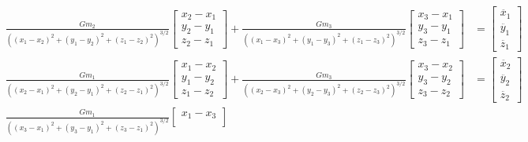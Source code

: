 \documentclass{report}
\begin{document}
            \begin{align}
                \frac{G m_2}{((x_1 - x_2)^2 + (y_1 - y_2)^2 + (z_1 - z_2)^2)^{3/2}} 
                \begin{bmatrix}
                    x_2 - x_1 \\
                    y_2 - y_1 \\
                    z_2 - z_1
                \end{bmatrix} + 
                \frac{G m_3}{((x_1 - x_3)^2 + (y_1 - y_3)^2 + (z_1 - z_3)^2)^{3/2}} 
                \begin{bmatrix}
                    x_3 - x_1 \\
                    y_3 - y_1 \\
                    z_3 - z_1
                \end{bmatrix} &= \begin{bmatrix}
                    \ddot{x_1} \\
                    \ddot{y_1} \\ 
                    \ddot{z_1}
                \end{bmatrix} \\
                \frac{G m_1}{((x_2 - x_1)^2 + (y_2 - y_1)^2 + (z_2 - z_1)^2)^{3/2}} 
                \begin{bmatrix}
                    x_1 - x_2 \\
                    y_1 - y_2 \\
                    z_1 - z_2
                \end{bmatrix} + 
                \frac{G m_3}{((x_2 - x_3)^2 + (y_2 - y_3)^2 + (z_2 - z_3)^2)^{3/2}} 
                \begin{bmatrix}
                    x_3 - x_2 \\
                    y_3 - y_2 \\
                    z_3 - z_2
                \end{bmatrix} &= \begin{bmatrix}
                    \ddot{x_2} \\
                    \ddot{y_2} \\ 
                    \ddot{z_2}
                \end{bmatrix} \\
                \frac{G m_1}{((x_3 - x_1)^2 + (y_3 - y_1)^2 + (z_3 - z_1)^2)^{3/2}} 
                \begin{bmatrix}
                    x_1 - x_3 \\

\end{bmatrix}
\end{align}
\end{document}
